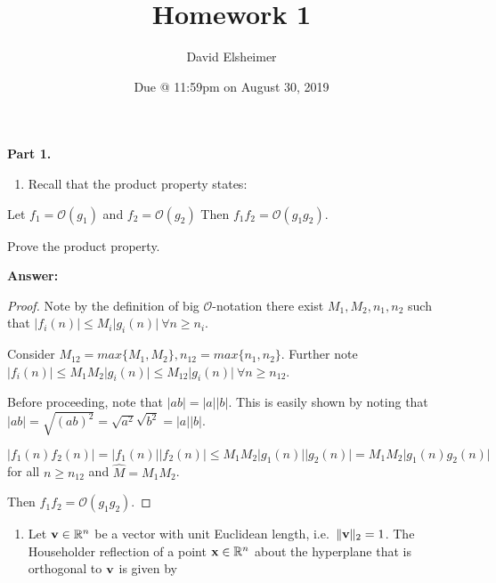 \documentclass[
]{article}
\title{Homework 1}
\author{David Elsheimer}
\date{Due @ 11:59pm on August 30, 2019}
\providecommand{\tightlist}{%
  \setlength{\itemsep}{0pt}\setlength{\parskip}{0pt}}
\begin{document}
\maketitle

\textbf{Part 1.}

\begin{enumerate}
\def\labelenumi{\arabic{enumi}.}
\tightlist
\item
  Recall that the product property states:
\end{enumerate}

Let \(f_1 = \mathcal{O}(g_1)\) and \(f_2 = \mathcal{O}(g_2)\) Then
\(f_1 f_2 = \mathcal{O}(g_1g_2)\).

Prove the product property.

\textbf{Answer:}

\begin{proof}

Note by the definition of big $\mathcal{O}$-notation there exist $M_1, M_2, n_1, n_2$ such that $\lvert f_i(n)\rvert \leq M_i\lvert g_i(n)\rvert \ \forall n \geq n_i$.

Consider $M_{12} = max\{M_1,M_2\}, n_{12} = max\{n_1,n_2\}$. Further note  $\lvert f_i(n)\rvert \leq M_{1}M_2\lvert g_i(n)\rvert  \leq M_{12}\lvert g_i(n)\rvert \ \forall n \geq n_{12}$.

Before proceeding, note that $\lvert ab\rvert = \lvert a\rvert\lvert b\rvert$. This is easily shown by noting that $\lvert ab\rvert = \sqrt{(ab)^2} = \sqrt{a^2}\sqrt{b^2} = \lvert a\rvert\lvert b\rvert$.

$\lvert f_1(n)f_2(n)\rvert = \lvert f_1(n)\rvert\lvert f_2(n)\rvert\leq M_{1}M_2\lvert g_1(n)\rvert\lvert g_2(n)\rvert= M_{1}M_2\lvert g_1(n)g_2(n)\rvert$ for all $n \geq n_{12}$ and $\hat{M} = M_1M_2$.

Then $f_1 f_2 = \mathcal{O}(g_1g_2)$.

\end{proof}

\begin{enumerate}
\def\labelenumi{\arabic{enumi}.}
\setcounter{enumi}{1}
\tightlist
\item
  Let \({\bm{\mathbf{\MakeLowercase{v}}}} \in \mathbb{R}^n\) be a vector
  with unit Euclidean length,
  i.e.~\(\lVert {\bm{\mathbf{\MakeLowercase{v}}}} \rVert_2 = 1\). The
  Householder reflection of a point
  \({\bm{\mathbf{\MakeLowercase{x}}}} \in \mathbb{R}^n\) about the
  hyperplane that is orthogonal to \({\bm{\mathbf{\MakeLowercase{v}}}}\)
  is given by
\end{enumerate}
\end{document}
